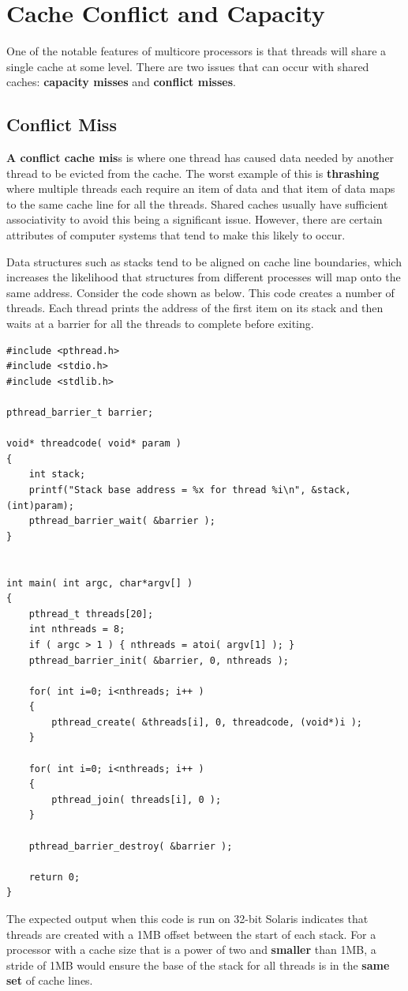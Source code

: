 \documentclass[12pt,a4paper]{report}
\begin{document}
\section{Cache Conflict and Capacity}
One of the notable features of multicore processors is that threads will share a single cache at some level. There are two issues that can occur with shared caches: \textbf{capacity misses} and \textbf{conflict misses}.
\subsection{Conflict Miss}
\textbf{A conflict cache mis}s is where one thread has caused data needed by another thread to be evicted from the cache. The worst example of this is \textbf{thrashing} where multiple threads each require an item of data and that item of data maps to the same cache line for all the threads. Shared caches usually have sufficient associativity to avoid this being a significant issue. However, there are certain attributes of computer systems that tend to make this likely to occur.
\par
Data structures such as stacks tend to be aligned on cache line boundaries, which increases the likelihood that structures from different processes will map onto the same address. Consider the code shown as below. This code creates a number of threads. Each thread prints the address of the first item on its stack and then waits at a barrier for all the threads to complete before exiting.
\begin{lstlisting}
#include <pthread.h>
#include <stdio.h>
#include <stdlib.h>

pthread_barrier_t barrier;

void* threadcode( void* param )
{
	int stack;
	printf("Stack base address = %x for thread %i\n", &stack, (int)param);
	pthread_barrier_wait( &barrier );
}


int main( int argc, char*argv[] )
{
	pthread_t threads[20];
	int nthreads = 8;
	if ( argc > 1 ) { nthreads = atoi( argv[1] ); }
	pthread_barrier_init( &barrier, 0, nthreads );
	
	for( int i=0; i<nthreads; i++ )
	{
		pthread_create( &threads[i], 0, threadcode, (void*)i );
	}
	
	for( int i=0; i<nthreads; i++ )
	{
		pthread_join( threads[i], 0 );
	}
	
	pthread_barrier_destroy( &barrier );
	
	return 0;
}
\end{lstlisting}
The expected output when this code is run on 32-bit Solaris indicates that threads are created with a 1MB offset between the start of each stack. For a processor with a cache size that is a power of two and \textbf{smaller} than 1MB, a stride of 1MB would ensure the base of the stack for all threads is in the \textbf{same set} of cache lines.
\end{document}
